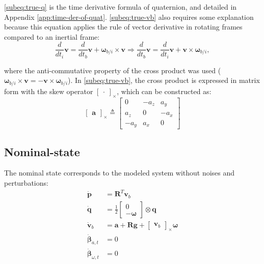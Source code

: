 \eqref{subeq:true-q} is the time derivative formula of quaternion, and detailed in Appendix \ref{app:time-der-of-quat}. \eqref{subeq:true-vb} also requires some explanation because this equation applies the rule of vector derivative in rotating frames compared to an inertial frame:
\begin{equation}
    \frac{d}{dt_i}\mathbf{v}=\frac{d}{dt_b}\mathbf{v}+\boldsymbol{\omega}_{b/i}\times\mathbf{v}\Rightarrow\frac{d}{dt_b}\mathbf{v}=\frac{d}{dt_i}\mathbf{v}+\mathbf{v}\times\boldsymbol{\omega}_{b/i},
\end{equation}

where the anti-commutative property of the cross product was used ($\boldsymbol{\omega}_{b/i}\times\mathbf{v}=-\mathbf{v}\times\boldsymbol{\omega}_{b/i}$). In \eqref{subeq:true-vb}, the cross product is expressed in matrix form with the skew operator $\begin{bmatrix}. \end{bmatrix}_{\times}$, which can be constructed as:
\begin{equation}
    \begin{bmatrix}\mathbf{a} \end{bmatrix}_{\times}\triangleq\begin{bmatrix}
        0 & -a_z & a_y \\
        a_z & 0 & -a_x \\
        -a_y & a_x & 0
    \end{bmatrix}
\end{equation}

\subsection*{Nominal-state}

The nominal state corresponds to the modeled system without noises and perturbations:
 \begin{subequations}
    \begin{align}
        \dot{\mathbf{p}} &= \mathbf{R}^T\mathbf{v}_{b} \\
        \dot{\mathbf{q}} &= \frac{1}{2}\begin{bmatrix}0\\ -\boldsymbol{\omega}\end{bmatrix} \otimes \mathbf{q} \\
        \dot{\mathbf{v}}_{b}&=\mathbf{a}+\mathbf{R}\mathbf{g} + \begin{bmatrix}\mathbf{v}_{b} \end{bmatrix}_{\times}\boldsymbol{\omega} \label{subeq:nom-vb}\\
        \dot{\boldsymbol{\beta}}_{a,t}&=0 \label{subeq:nom-ba}\\
        \dot{\boldsymbol{\beta}}_{\omega,t}&=0 \label{subeq:nom-bw}
    \end{align}
    \label{eq:nominal-state}
\end{subequations}

